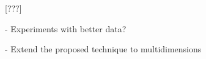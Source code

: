 [???]

- Experiments with better data?

- Extend the proposed technique to multidimensions































\begin{comment}
\begin{figure}
 \caption{Precision - Recall }
 \centering
 \begin{tikzpicture}[scale=1.0]
  \begin{axis}[
	width=15cm, height=10cm,
	xlabel=\textsc{Recall},
	ylabel=\textsc{Precision},
	legend entries={Support only, KL-divergence*Support, KL-divergence only, JS-divergence*Support},
	legend style={legend pos=north east,font=\tiny}]
      ]


\end{comment}
